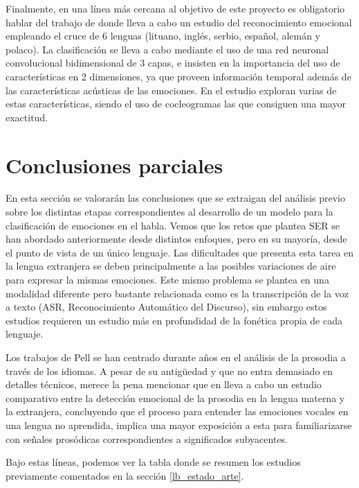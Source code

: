 \documentclass[11pt,a4paper,spanish]{book}
\begin{document}
	 Finalmente, en una línea más cercana al objetivo de este proyecto es obligatorio hablar del trabajo de \cite{Tamulevicius2020} donde lleva a cabo un estudio del reconocimiento emocional empleando el cruce de 6 lenguas (lituano, inglés, serbio, español, alemán y polaco). La clasificación se lleva a cabo mediante el uso de una red neuronal convolucional bidimensional de 3 capas, e insisten en la importancia del uso de características en 2 dimensiones, ya que proveen información temporal además de las características acústicas de las emociones. En el estudio exploran varias de estas características, siendo el uso de cocleogramas las que consiguen una mayor exactitud.
	
	\section{Conclusiones parciales}
	En esta sección se valorarán las conclusiones que se extraigan del análisis previo sobre los distintas etapas correspondientes al desarrollo de un modelo para la clasificación de emociones en el habla. Vemos que los retos que plantea SER se han abordado anteriormente desde distintos enfoques, pero en su mayoría, desde el punto de vista de un único lenguaje. Las dificultades que presenta esta tarea en la lengua extranjera se deben principalmente a las posibles variaciones de aire para expresar la mismas emociones. Este mismo problema se plantea en una modalidad diferente pero bastante relacionada como es la transcripción de la voz a texto (ASR, Reconocimiento Automático del Discurso), sin embargo estos estudios requieren un estudio más en profundidad de la fonética propia de cada lenguaje.
	
	Los trabajos de Pell se han centrado durante años en el análisis de la prosodia a través de los idiomas. A pesar de su antigüedad y que no entra demasiado en detalles técnicos, merece la pena mencionar que en \cite{Pell2008} lleva a cabo un estudio comparativo entre la detección emocional de la prosodia en la lengua materna y la extranjera, concluyendo que el proceso para entender las emociones vocales en una lengua no aprendida, implica una mayor exposición a esta para familiarizarse con señales prosódicas correspondientes a significados subyacentes.\hfill \break
	
	Bajo estas líneas, podemos ver la tabla donde se resumen los estudios previamente comentados en la sección \ref{lb_estado_arte}.\\
\end{document}
